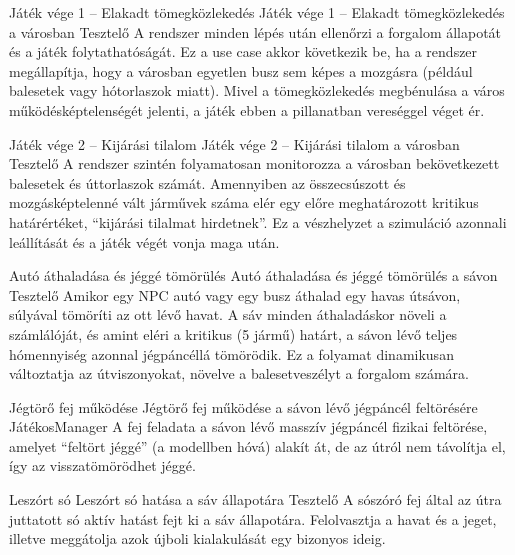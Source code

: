 \begin{use-case}
    {Játék vége 1 – Elakadt tömegközlekedés}
    {Játék vége 1 – Elakadt tömegközlekedés a városban}
    {Tesztelő}
    A rendszer minden lépés után ellenőrzi a forgalom állapotát és a játék folytathatóságát. Ez a use case akkor következik be, ha a rendszer megállapítja, hogy a városban egyetlen busz sem képes a mozgásra (például balesetek vagy hótorlaszok miatt). Mivel a tömegközlekedés megbénulása a város működésképtelenségét jelenti, a játék ebben a pillanatban vereséggel véget ér.
\end{use-case}

\begin{use-case}
    {Játék vége 2 – Kijárási tilalom}
    {Játék vége 2 – Kijárási tilalom a városban}
    {Tesztelő}
    A rendszer szintén folyamatosan monitorozza a városban bekövetkezett balesetek és úttorlaszok számát. Amennyiben az összecsúszott és mozgásképtelenné vált járművek száma elér egy előre meghatározott kritikus határértéket, “kijárási tilalmat hirdetnek”. Ez a vészhelyzet a szimuláció azonnali leállítását és a játék végét vonja maga után.
\end{use-case}

\begin{use-case}
    {Autó áthaladása és jéggé tömörülés}
    {Autó áthaladása és jéggé tömörülés a sávon}
    {Tesztelő}
    Amikor egy NPC autó vagy egy busz áthalad egy havas útsávon, súlyával tömöríti az ott lévő havat. A sáv minden áthaladáskor növeli a számlálóját, és amint eléri a kritikus (5 jármű) határt, a sávon lévő teljes hómennyiség azonnal jégpáncéllá tömörödik. Ez a folyamat dinamikusan változtatja az útviszonyokat, növelve a balesetveszélyt a forgalom számára.
\end{use-case}

\begin{use-case}
    {Jégtörő fej működése}
    {Jégtörő fej működése a sávon lévő jégpáncél feltörésére}
    {JátékosManager}
    A fej feladata a sávon lévő masszív jégpáncél fizikai feltörése, amelyet “feltört jéggé” (a modellben hóvá) alakít át, de az útról nem távolítja el, így az visszatömörödhet jéggé. 
\end{use-case}

\begin{use-case}
    {Leszórt só}
    {Leszórt só hatása a sáv állapotára}
    {Tesztelő}
    A sószóró fej által az útra juttatott só aktív hatást fejt ki a sáv állapotára. Felolvasztja a havat és a jeget, illetve meggátolja azok újboli kialakulását egy bizonyos ideig. 
\end{use-case}

